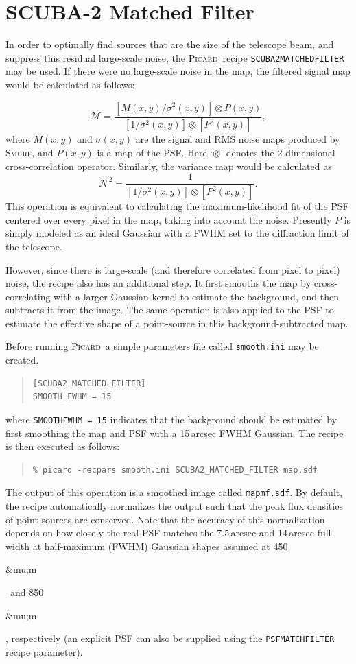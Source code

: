 \documentclass[twoside,11pt]{article}
\newcommand{\micron}{\mbox{\,${\umu}$m}}            %
\newcounter{box}
\newcommand{\xref}[3]{#1}
\newcommand{\xlabel}[1]{}
\renewcommand{\_}{\texttt{\symbol{95}}}
\newenvironment{myquote}{\begin{quote}\begin{small}}{\end{small}\end{quote}}
\newcommand{\picard}{\xref{\textsc{Picard}}{sun265}{}}
\newcommand{\smurf}{\xref{\textsc{Smurf}}{sun258}{}}
\newcommand{\drrecipe}[1]{\texttt{#1}}
\newcommand{\param}[1]{\texttt{#1}}
\renewcommand{\micron}{\begin{rawhtml}&mu;m\end{rawhtml}}
\begin{document}
\section{\xlabel{matchedfilter}SCUBA-2 Matched Filter}
\label{app:mf}
In order to optimally find sources that are the size of the telescope beam, and suppress this residual large-scale noise, the \picard\ recipe \drrecipe{SCUBA2\_MATCHED\_FILTER} may be used. If there were no large-scale noise in the map, the filtered signal map would be calculated as follows:

\begin{equation}
\mathcal{M} = \frac{[M(x,y)/\sigma^2(x,y)] \otimes P(x,y)}
  {[1/\sigma^2(x,y)] \otimes [P^2(x,y)]},
\end{equation}
%
where $M(x,y)$ and $\sigma(x,y)$ are the signal and RMS
noise maps produced by \smurf, and $P(x,y)$ is a map of the
PSF. Here `$\otimes$' denotes the 2-dimensional cross-correlation
operator. Similarly, the variance map would be calculated as
%
\begin{equation}
  \mathcal{N}^2 = \frac{1}{[1/\sigma^2(x,y)] \otimes [P^2(x,y)]}.
\end{equation}
%
This operation is equivalent to calculating the maximum-likelihood fit
of the PSF centered over every pixel in the map, taking into account
the noise. Presently $P$ is simply modeled as an ideal Gaussian
with a FWHM set to the diffraction limit of the telescope.

However, since there is large-scale (and therefore correlated from
pixel to pixel) noise, the recipe also has an additional step. It
first smooths the map by cross-correlating with a larger Gaussian
kernel to estimate the background, and then subtracts it from the
image. The same operation is also applied to the PSF to estimate the
effective shape of a point-source in this background-subtracted map.

Before running \picard\, a simple parameters file called \texttt{smooth.ini} may be created.
\begin{myquote}
\begin{verbatim}
[SCUBA2_MATCHED_FILTER]
SMOOTH_FWHM = 15
\end{verbatim}
\end{myquote}
%
where \texttt{SMOOTH\_FWHM = 15} indicates that the background should
be estimated by first smoothing the map and PSF with a 15\,arcsec FWHM
Gaussian. The recipe is then executed as follows:
%
\begin{myquote}
\begin{verbatim}
% picard -recpars smooth.ini SCUBA2_MATCHED_FILTER map.sdf
\end{verbatim}
\end{myquote}
%
The output of this operation is a smoothed image called \texttt{map\_mf.sdf}. By default, the recipe automatically normalizes the output such that the peak flux densities of point sources are conserved. Note that the accuracy of this normalization depends on how closely the real PSF matches the 7.5\,arcsec and 14\,arcsec full-width at half-maximum (FWHM) Gaussian shapes assumed at 450\micron\ and 850\micron, respectively (an explicit PSF can also be supplied using the \param{PSF\_MATCHFILTER} recipe parameter).
\end{document}

